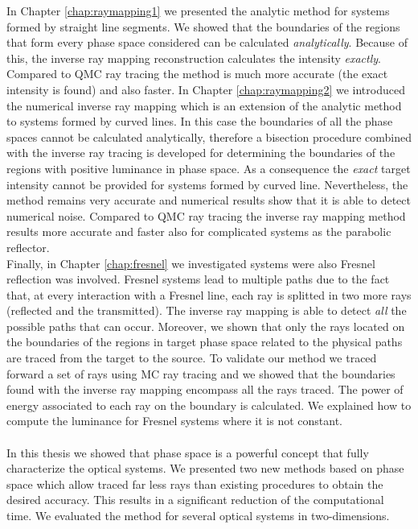 In Chapter \ref{chap:raymapping1} we presented the analytic method for systems formed by straight line segments. We showed that the boundaries of the regions that form every phase space considered can be calculated \textit{analytically}. Because of this, the inverse ray mapping reconstruction calculates the intensity \textit{exactly}. Compared to QMC ray tracing the method is much more accurate (the exact intensity is found) and also faster. In Chapter \ref{chap:raymapping2} we introduced the numerical inverse ray mapping which is an extension of the analytic method to systems formed by curved lines. In this case the boundaries of all the phase spaces cannot be calculated analytically, therefore a bisection procedure combined with the inverse ray tracing is developed for determining the boundaries of the regions with positive luminance in phase space. As a consequence the \textit{exact} target intensity cannot be provided for systems formed by curved line. Nevertheless, the method remains very accurate and numerical results show that it is able to detect numerical noise. Compared to QMC ray tracing the inverse ray mapping method results more accurate and faster also for complicated systems as the parabolic reflector. \\ \indent 
Finally, in Chapter \ref{chap:fresnel} we investigated systems were also Fresnel reflection was involved. Fresnel systems lead to multiple paths due to the fact that, at every interaction with a Fresnel line, each ray is splitted in two more rays (reflected and the transmitted). The inverse ray mapping is able to detect \textit{all} the possible paths that can occur. Moreover, we shown that only the rays located on the boundaries of the regions in target phase space related to the physical paths are traced from the target to the source. To validate our method we traced forward a set of rays using MC ray tracing and we showed that the boundaries found with the inverse ray mapping encompass all the rays traced. 
The power of energy associated to each ray on the boundary is calculated. 
We explained how to compute the luminance for Fresnel systems where it is not constant. 
\\ \\ \indent In this thesis we showed that phase space is a powerful concept that fully characterize the optical systems. We presented two new methods based on phase space which allow traced far less rays than existing procedures to obtain the desired accuracy. This results in a significant reduction of the computational time. We evaluated the method for several optical systems in two-dimensions.

